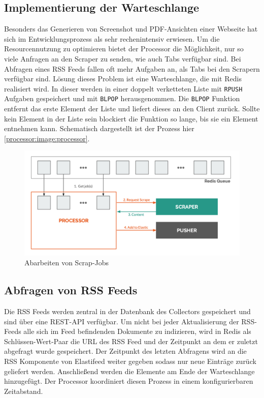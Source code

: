 \subsection{Implementierung der Warteschlange}

Besonders das Generieren von Screenshot und PDF-Ansichten einer Webseite hat sich im Entwicklungsprozess als sehr rechenintensiv erwiesen.
Um die Resourcennutzung zu optimieren bietet der Processor die Möglichkeit, nur so viele Anfragen an den Scraper zu senden, wie auch Tabs verfügbar sind.
Bei Abfragen eines RSS Feeds fallen oft mehr Aufgaben an, als Tabs bei den Scrapern verfügbar sind.
Lösung dieses Problem ist eine Warteschlange, die mit Redis \cite{redis} realisiert wird.
In dieser werden in einer doppelt verketteten Liste mit \texttt{RPUSH} Aufgaben gespeichert und mit \texttt{BLPOP} herausgenommen.
Die \texttt{BLPOP} Funktion entfernt das erste Element der Liste und liefert dieses an den Client zurück.
Sollte kein Element in der Liste sein blockiert die Funktion so lange, bis sie ein Element entnehmen kann.
Schematisch dargestellt ist der Prozess hier \autoref{processor:image:processor}.

\begin{figure}[t]
  \centering
  \includegraphics[width=\linewidth]{images/processor.png}
  \caption{Abarbeiten von Scrap-Jobs}
  \label{processor:image:processor}
\end{figure}


\subsection{Abfragen von RSS Feeds}
Die RSS Feeds werden zentral in der Datenbank des Collectors gespeichert und sind über eine REST-API verfügbar.
Um nicht bei jeder Aktualisierung der RSS-Feeds alle sich im Feed befindenden Dokumente zu indizieren, wird in Redis als Schlüssen-Wert-Paar die URL des RSS Feed und der Zeitpunkt an dem er zuletzt abgefragt wurde gespeichert.
Der Zeitpunkt des letzten Abfragens wird an die RSS Komponente von Elastifeed weiter gegeben sodass nur neue Einträge zurück geliefert werden.
Anschließend werden die Elemente am Ende der Warteschlange hinzugefügt.
Der Processor koordiniert diesen Prozess in einem konfigurierbaren Zeitabstand.

